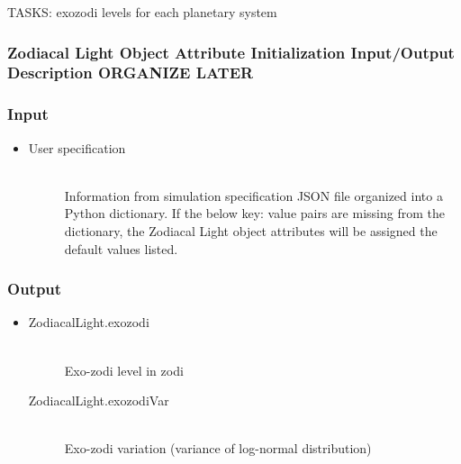 \documentclass[cleanfoot]{asme2ej}
\begin{document}
TASKS: exozodi levels for each planetary system

\label{sec:zodiacallight}
\subsubsection{Zodiacal Light Object Attribute Initialization Input/Output Description ORGANIZE LATER}
\subsubsection*{Input}
\begin{itemize}
    \item
    \begin{description}
        \item[User specification] \hfill \\
        Information from simulation specification JSON file organized into a Python dictionary. If the below key: value pairs are missing from the dictionary, the Zodiacal Light object attributes will be assigned the default values listed.
    \end{description}
\end{itemize}

\subsubsection*{Output}
\begin{itemize}
    \item 
    \begin{description}
        \item[ZodiacalLight.exozodi] \hfill \\
        Exo-zodi level in zodi
        \item[ZodiacalLight.exozodiVar] \hfill \\
        Exo-zodi variation (variance of log-normal distribution)
    \end{description}
\end{itemize}
\end{document}
